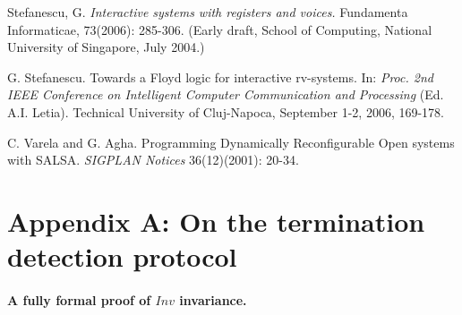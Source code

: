\documentclass[runningheads]{llncs}
\newcommand{\1}{\u{a}}
\newcommand{\2}{\c{s}}
\newcommand{\5}{\c{t}}
\newcommand{\8}{\^{\i}}
\newcommand{\9}{\^{a}}
\def\newblock{}
\def\newblock{}
\begin{document}
\begin{thebibliography}{99}
Stefanescu, G.
\newblock {\it Interactive systems with registers and voices.} 
\newblock Fundamenta Informaticae, 73(2006): 285-306.
\newblock (Early draft, School of Computing, National University of Singapore, July 2004.)

G. Stefanescu.
\newblock Towards a Floyd logic for interactive rv-systems.
\newblock In: {\it Proc. 2nd IEEE Conference on Intelligent Computer Communication and Processing} (Ed. A.I. Letia). 
\newblock Technical University of Cluj-Napoca, September 1-2, 2006, 169-178.

C. Varela and G. Agha. 
\newblock Programming Dynamically Reconfigurable Open systems with SALSA. 
\newblock {\it SIGPLAN Notices} 36(12)(2001): 20-34.

\end{thebibliography}

\newpage
\section*{Appendix A: On the termination detection protocol}

\paragraph{A fully formal proof of $Inv$ invariance.}
\end{document}
